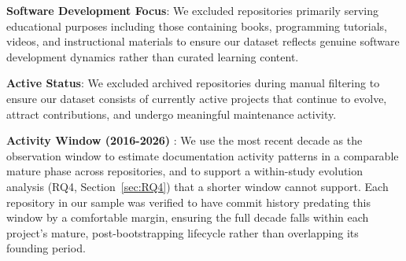 \documentclass[10pt,conference]{IEEEtran}
\begin{document}
\noindent \textbf{Software Development Focus}: We excluded repositories 
primarily serving educational purposes including those containing 
books, programming tutorials, videos, and instructional materials 
to ensure our dataset reflects genuine software development dynamics 
rather than curated learning content.
    
\noindent \textbf{Active Status}: We excluded archived repositories during 
manual filtering to ensure our dataset consists of currently active 
projects that continue to evolve, attract contributions, and undergo 
meaningful maintenance activity.
    
\noindent \textbf{Activity Window (2016-2026)} :
We use the most recent decade as the observation window to estimate documentation activity patterns in a comparable mature phase across repositories, and to support a within-study evolution analysis (RQ4, Section~\ref{sec:RQ4}) that a shorter window cannot support. Each repository in our sample was verified to have commit history predating this window by a comfortable margin, ensuring the full decade falls within each project's mature, post-bootstrapping lifecycle rather than overlapping its founding period.
\end{document}
